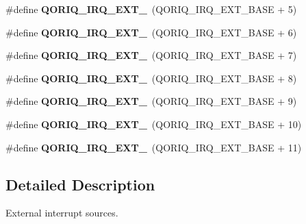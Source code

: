 \begin{DoxyCompactItemize}
\#define {\bfseries Q\+O\+R\+I\+Q\+\_\+\+I\+R\+Q\+\_\+\+E\+X\+T\+\_}~(Q\+O\+R\+I\+Q\+\_\+\+I\+R\+Q\+\_\+\+E\+X\+T\+\_\+\+B\+A\+SE + 5)
\item 
\mbox{\label{group__QoriqInterruptExternal_gaea90fb7d3e41389d0583b4c6226a3d8a}} 
\#define {\bfseries Q\+O\+R\+I\+Q\+\_\+\+I\+R\+Q\+\_\+\+E\+X\+T\+\_}~(Q\+O\+R\+I\+Q\+\_\+\+I\+R\+Q\+\_\+\+E\+X\+T\+\_\+\+B\+A\+SE + 6)
\item 
\mbox{\label{group__QoriqInterruptExternal_ga59edb22ea67c2b956b2efb991b4ce0b7}} 
\#define {\bfseries Q\+O\+R\+I\+Q\+\_\+\+I\+R\+Q\+\_\+\+E\+X\+T\+\_}~(Q\+O\+R\+I\+Q\+\_\+\+I\+R\+Q\+\_\+\+E\+X\+T\+\_\+\+B\+A\+SE + 7)
\item 
\mbox{\label{group__QoriqInterruptExternal_ga4ef2c00b0077e2df4bc0d10a278eb681}} 
\#define {\bfseries Q\+O\+R\+I\+Q\+\_\+\+I\+R\+Q\+\_\+\+E\+X\+T\+\_}~(Q\+O\+R\+I\+Q\+\_\+\+I\+R\+Q\+\_\+\+E\+X\+T\+\_\+\+B\+A\+SE + 8)
\item 
\mbox{\label{group__QoriqInterruptExternal_ga2cd9bbb44ae3438c001f4c89085eae77}} 
\#define {\bfseries Q\+O\+R\+I\+Q\+\_\+\+I\+R\+Q\+\_\+\+E\+X\+T\+\_}~(Q\+O\+R\+I\+Q\+\_\+\+I\+R\+Q\+\_\+\+E\+X\+T\+\_\+\+B\+A\+SE + 9)
\item 
\mbox{\label{group__QoriqInterruptExternal_gab8d6f9093d083b30d8e3763599832bc5}} 
\#define {\bfseries Q\+O\+R\+I\+Q\+\_\+\+I\+R\+Q\+\_\+\+E\+X\+T\+\_}~(Q\+O\+R\+I\+Q\+\_\+\+I\+R\+Q\+\_\+\+E\+X\+T\+\_\+\+B\+A\+SE + 10)
\item 
\mbox{\label{group__QoriqInterruptExternal_ga98f4db2ab415931330a927de05e9d619}} 
\#define {\bfseries Q\+O\+R\+I\+Q\+\_\+\+I\+R\+Q\+\_\+\+E\+X\+T\+\_}~(Q\+O\+R\+I\+Q\+\_\+\+I\+R\+Q\+\_\+\+E\+X\+T\+\_\+\+B\+A\+SE + 11)
\end{DoxyCompactItemize}


\subsection{Detailed Description}
External interrupt sources. 

